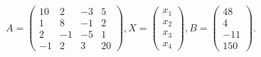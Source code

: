 \documentclass[12pt]{article}
\begin{document}
$ \begin{equation*}A=\begin{pmatrix}10 & 2 & -3 & 5 \\1 & 8 & -1 & 2 \\2 & -1 & -5 & 1 \\ -1 & 2 & 3 & 20\end{pmatrix}, X=\begin{pmatrix}x_1 \\x_2 \\x_3 \\ x_4\end{pmatrix}, B = \begin{pmatrix}48 \\4 \\-11 \\ 150\end{pmatrix}.\end{equation*} $
\end{document}
